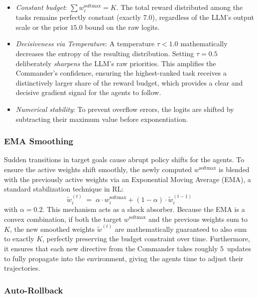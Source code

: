 \begin{itemize}
    \item \emph{Constant budget}: $\sum w_i^{\text{softmax}} = K$. The total reward distributed among the tasks remains perfectly constant (exactly $7.0$), regardless of the LLM's output scale or the prior $15.0$ bound on the raw logits.
    \item \emph{Decisiveness via Temperature}: A temperature $\tau < 1.0$ mathematically decreases the entropy of the resulting distribution. Setting $\tau=0.5$ deliberately \emph{sharpens} the LLM's raw priorities. This amplifies the Commander's confidence, ensuring the highest-ranked task receives a distinctively larger share of the reward budget, which provides a clear and decisive gradient signal for the agents to follow.
    \item \emph{Numerical stability}: To prevent overflow errors, the logits are shifted by subtracting their maximum value before exponentiation.
\end{itemize}

\subsubsection{EMA Smoothing}
\label{sec:ema_smoothing}

Sudden transitions in target goals cause abrupt policy shifts for the agents. To ensure the active weights shift smoothly, the newly computed $w^{\text{softmax}}$ is blended with the previously active weights via an Exponential Moving Average (EMA), a standard stabilization technique in RL:
\begin{equation}
\label{eq:ema}
    \widetilde{w}_i^{(t)}
    \;=\;
    \alpha \cdot w_i^{\text{softmax}}
    + (1-\alpha) \cdot \widetilde{w}_i^{(t-1)}
\end{equation}
with $\alpha=0.2$. This mechanism acts as a shock absorber. Because the EMA is a convex combination, if both the target $w^{\text{softmax}}$ and the previous weights sum to $K$, the new smoothed weights $\widetilde{w}^{(t)}$ are mathematically guaranteed to also sum to exactly $K$, perfectly preserving the budget constraint over time. Furthermore, it ensures that each new directive from the Commander takes roughly $5$~updates to fully propagate into the environment, giving the agents time to adjust their trajectories.

\subsubsection{Auto-Rollback}
\label{sec:safety_rollback}

